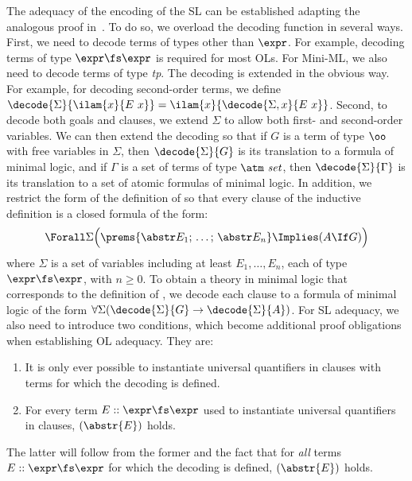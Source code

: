 \documentclass[final]{svjour3}
\begin{document}
The adequacy of the encoding of the SL can be established adapting the
analogous proof in~\cite{McDowell01}.  To do so, we overload the decoding
function in several ways.  First, we need to decode terms of
types other than $\expr$.  For example, decoding terms of type
$\expr\fs\expr$ is required for most OLs.  For Mini-ML, we also need
to decode terms of type \textit{tp}.  The decoding is extended in the
obvious way.  For example, for decoding second-order terms, we define
$\decode{\Sigma}{\ilam{x}{E\ x}} = \ilam{x}{\decode{\Sigma,x}{E\ x}}$.
Second, to decode both goals and clauses, we extend $\Sigma$ to allow
both first- and second-order variables.  We can then extend the
decoding so that if $G$ is a term of type $\oo$ with free variables in
$\Sigma$, then $\decode{\Sigma}{G}$ is its translation to a formula of
minimal logic, and if $\Gamma$ is a set of terms of type $\atm\
\mathit{set}$, then $\decode{\Sigma}{\Gamma}$ is its translation to a
set of atomic formulas of minimal logic.  In addition, we restrict the
form of the definition of \ikw{prog} so that every clause of the
inductive definition is a closed formula of the form:
$$\Forall \Sigma \Bigl(\prems{\abstr E_1;\,\ldots;\,\abstr E_n}
\Implies (A \If G)\Bigr)$$ where $\Sigma$ is a set of variables
including at least $E_1,\ldots,E_n$, each of type $\expr\fs\expr$,
with $n\geq 0$.  To obtain a theory in minimal logic that corresponds
to the definition of \ikw{prog}, we decode each clause to a formula of
minimal logic of the form $\forall
\Sigma(\decode{\Sigma}{G}\to\decode{\Sigma}{A})$. For SL adequacy, we
also need to introduce two conditions, which become additional proof
obligations when establishing OL adequacy.  They are:
\begin{enumerate}
\item It is only ever possible to instantiate universal quantifiers in
\ikw{prog} clauses with terms for which the decoding is defined.
\item For every term $E ::\expr\fs\expr$ used to instantiate universal
quantifiers in \ikw{prog} clauses, $(\abstr{E})$ holds.
\end{enumerate}
The latter will follow from the former and the fact that for
\emph{all} terms $E ::\expr\fs\expr$ for which the decoding is
defined, $(\abstr{E})$ holds.
\end{document}
